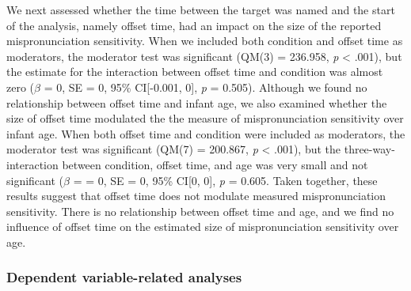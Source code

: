 \documentclass[man]{apa6}
\theoremstyle{definition}
\theoremstyle{definition}
\theoremstyle{definition}
\theoremstyle{remark}
\begin{document}
We next assessed whether the time between the target was named and the
start of the analysis, namely offset time, had an impact on the size of
the reported mispronunciation sensitivity. When we included both
condition and offset time as moderators, the moderator test was
significant (QM(3) = 236.958, \emph{p} \textless{} .001), but the
estimate for the interaction between offset time and condition was
almost zero (\(\beta\) = 0, SE = 0, 95\% CI{[}-0.001, 0{]}, \emph{p} =
0.505). Although we found no relationship between offset time and infant
age, we also examined whether the size of offset time modulated the the
measure of mispronunciation sensitivity over infant age. When both
offset time and condition were included as moderators, the moderator
test was significant (QM(7) = 200.867, \emph{p} \textless{} .001), but
the three-way-interaction between condition, offset time, and age was
very small and not significant (\(\beta\) = = 0, SE = 0, 95\% CI{[}0,
0{]}, \emph{p} = 0.605. Taken together, these results suggest that
offset time does not modulate measured mispronunciation sensitivity.
There is no relationship between offset time and age, and we find no
influence of offset time on the estimated size of mispronunciation
sensitivity over age.

\subsubsection{Dependent variable-related
analyses}\label{dependent-variable-related-analyses}
\end{document}
